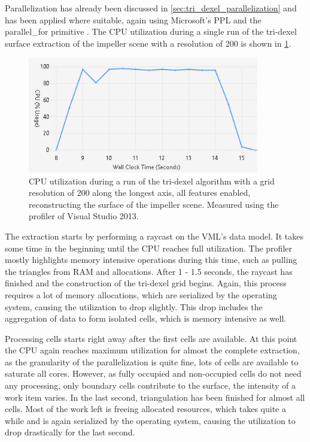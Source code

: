 Parallelization has already been discussed in \cref{sec:tri_dexel_parallelization} and has been applied where suitable, again using Microsoft's PPL and the parallel\_for primitive \cite{ppl_parallel_for}.
The CPU utilization during a single run of the tri-dexel surface extraction of the impeller scene with a resolution of 200 is shown in \cref{fig:td_hq_impeller_cpu}.
%
\begin{figure}
	\centering
	\includegraphics[width=0.9\textwidth]{images/td_hq_impeller_cpu}
	\caption{
		CPU utilization during a run of the tri-dexel algorithm with a grid resolution of 200 along the longest axis, all features enabled, reconstructing the surface of the impeller scene.
		Measured using the profiler of Visual Studio 2013.
	}
	\label{fig:td_hq_impeller_cpu}
\end{figure}
%
The extraction starts by performing a raycast on the VML's data model.
It takes some time in the beginning until the CPU reaches full utilization.
The profiler mostly highlights memory intensive operations during this time, such as pulling the triangles from RAM and allocations.
After 1 - 1.5 seconds, the raycast has finished and the construction of the tri-dexel grid begins.
Again, this process requires a lot of memory allocations, which are serialized by the operating system, causing the utilization to drop slightly.
This drop includes the aggregation of data to form isolated cells, which is memory intensive as well.

Processing cells starts right away after the first cells are available.
At this point the CPU again reaches maximum utilization for almost the complete extraction, as the granularity of the parallelization is quite fine, \ie lots of cells are available to saturate all cores.
However, as fully occupied and non-occupied cells do not need any processing, only boundary cells contribute to the surface, the intensity of a work item varies.
In the last second, triangulation has been finished for almost all cells.
Most of the work left is freeing allocated resources, which takes quite a while and is again serialized by the operating system, causing the utilization to drop drastically for the last second.

